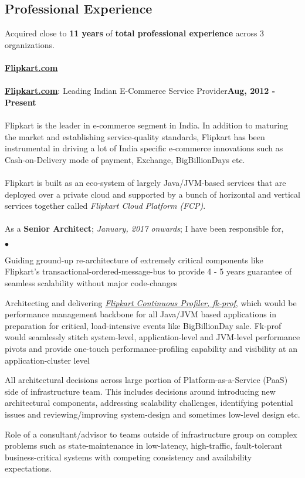 \documentclass[margin,line]{res}
\newenvironment{list2}{
  \begin{list}{$\bullet$}{%
      \setlength{\itemsep}{0in}
      \setlength{\parsep}{0in} \setlength{\parskip}{0in}
      \setlength{\topsep}{0in} \setlength{\partopsep}{0in} 
      \setlength{\leftmargin}{0.2in}}}{\end{list}}
\begin{document}
\begin{resume}
\section{\sc Professional Experience}
\vspace{.4cm}
Acquired close to {\bf 11 years} of {\bf total professional experience} across 3 organizations.\\
\\
{\underline {\bf Flipkart.com}}\\
\\
\href{https://www.flipkart.com/}{\bf Flipkart.com}: Leading Indian E-Commerce Service Provider\hfill {\bf Aug, 2012 - Present}\\
\vspace{-.2cm}\\
Flipkart is the leader in e-commerce segment in India. In addition to maturing the market and establishing service-quality standards, Flipkart has been instrumental in driving a lot of India specific e-commerce innovations such as Cash-on-Delivery mode of payment, Exchange, BigBillionDays etc.\\
\\
Flipkart is built as an eco-system of largely Java/JVM-based services that are deployed over a private cloud and supported by a bunch of horizontal and vertical services together called {\em Flipkart Cloud Platform (FCP)}.\\
\\
As a {\bf Senior Architect}; {\em January, 2017 onwards}; I have been responsible for,\\
\begin{list2}
\item Guiding ground-up re-architecture of extremely critical components like Flipkart's transactional-ordered-message-bus to provide 4 - 5 years guarantee of seamless scalability without major code-changes
\item Architecting and delivering \href{https://github.com/Flipkart/fk-prof}{\em Flipkart Continuous Profiler, fk-prof}, which would be performance management backbone for all Java/JVM based applications in preparation for critical, load-intensive events like BigBillionDay sale. Fk-prof would seamlessly stitch system-level, application-level and JVM-level performance pivots and provide one-touch performance-profiling capability and visibility at an application-cluster level
\item All architectural decisions across large portion of Platform-as-a-Service (PaaS) side of infrastructure team. This includes decisions around introducing new architectural components, addressing scalability challenges, identifying potential issues and reviewing/improving system-design and sometimes low-level design etc.
\item Role of a consultant/advisor to teams outside of infrastructure group on complex problems such as state-maintenance in low-latency, high-traffic, fault-tolerant business-critical systems with competing consistency and availability expectations.
\end{list2}


\end{resume}
\end{document}
